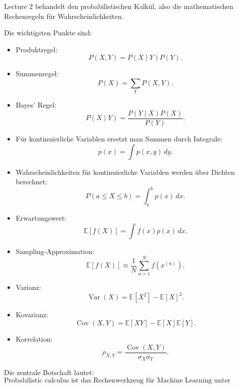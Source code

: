 \documentclass[11pt,a4paper]{scrartcl}
\begin{document}
\begin{answerbox}
    Lecture 2 behandelt den probabilistischen Kalkül, also die mathematischen
    Rechenregeln für Wahrscheinlichkeiten.

    Die wichtigsten Punkte sind:

    \begin{itemize}
        \item Produktregel:
        \[
            P(X,Y)
            =
            P(X \mid Y)P(Y).
        \]

        \item Summenregel:
        \[
            P(X)
            =
            \sum_Y P(X,Y).
        \]

        \item Bayes' Regel:
        \[
            P(X \mid Y)
            =
            \frac{P(Y \mid X)P(X)}{P(Y)}.
        \]

        \item Für kontinuierliche Variablen ersetzt man Summen durch Integrale:
        \[
            p(x)
            =
            \int p(x,y)\,dy.
        \]

        \item Wahrscheinlichkeiten für kontinuierliche Variablen werden über
        Dichten berechnet:
        \[
            P(a \leq X \leq b)
            =
            \int_a^b p(x)\,dx.
        \]

        \item Erwartungswert:
        \[
            \mathbb{E}[f(X)]
            =
            \int f(x)p(x)\,dx.
        \]

        \item Sampling-Approximation:
        \[
            \mathbb{E}[f(X)]
            \approx
            \frac{1}{N}
            \sum_{n=1}^{N} f(x^{(n)}).
        \]

        \item Varianz:
        \[
            \operatorname{Var}(X)
            =
            \mathbb{E}[X^2] - \mathbb{E}[X]^2.
        \]

        \item Kovarianz:
        \[
            \operatorname{Cov}(X,Y)
            =
            \mathbb{E}[XY]
            -
            \mathbb{E}[X]\mathbb{E}[Y].
        \]

        \item Korrelation:
        \[
            \rho_{X,Y}
            =
            \frac{\operatorname{Cov}(X,Y)}
            {\sigma_X\sigma_Y}.
        \]
    \end{itemize}

    Die zentrale Botschaft lautet:
    \[
        \boxed{
            \text{Probabilistic calculus ist das Rechenwerkzeug für Machine Learning unter Unsicherheit.}
        }
    \]
\end{answerbox}
\end{document}
